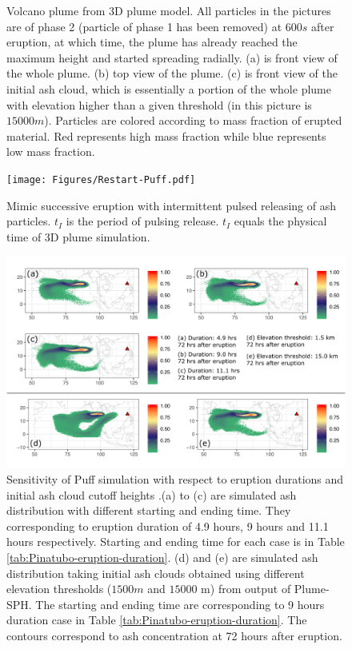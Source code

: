 \documentclass[utf8]{frontiersSCNS} %
\begin{document}
\begin{figure}[!htb]
\begin{minipage}{.325 \textwidth}
\end{minipage}%
\caption{Volcano plume from 3D plume model. All particles in the pictures are of  phase 2 (particle of phase 1 has been removed) at $600s$ after eruption, at which time, the plume has already reached the maximum height and started spreading radially. (a) is front view of the whole plume. (b) top view of the plume. (c) is front view of the initial ash cloud, which is essentially a portion of the whole plume with elevation higher than a given threshold (in this picture is $15000 m$). Particles are colored according to mass fraction of erupted material. Red represents high mass fraction while blue represents low mass fraction.}
\label{fig:Plume-SPH-Pinatubo-ash-cloud}
\end{figure}

\begin{figure}
\center
\texttt{[image: Figures/Restart-Puff.pdf]}
\caption{Mimic successive eruption with intermittent pulsed releasing of ash particles. $t_I$ is the period of pulsing release. $t_I$ equals the physical time of 3D plume simulation.}
\label{fig:Restart-Puff}
\end{figure}

\begin{figure}[!htb]
\centering
\includegraphics[width=0.99 \textwidth]{Figures/duration_cutoff}
\caption{Sensitivity of Puff simulation with respect to eruption durations and initial ash cloud cutoff heights .(a) to (c) are simulated ash distribution with different starting and ending time. They corresponding to eruption duration of 4.9 hours, 9 hours and 11.1 hours respectively. Starting and ending time for each case is in Table \ref{tab:Pinatubo-eruption-duration}. (d) and (e) are simulated ash distribution taking initial ash clouds obtained using different elevation thresholds ($1500 m$ and $15000$ m) from output of Plume-SPH. The starting and ending time are corresponding to 9 hours duration case in Table \ref{tab:Pinatubo-eruption-duration}. The contours correspond to ash concentration at 72 hours after eruption.}
\label{fig:Puff-sensitivity-duration-cutoff} 
\end{figure}
\end{document}
